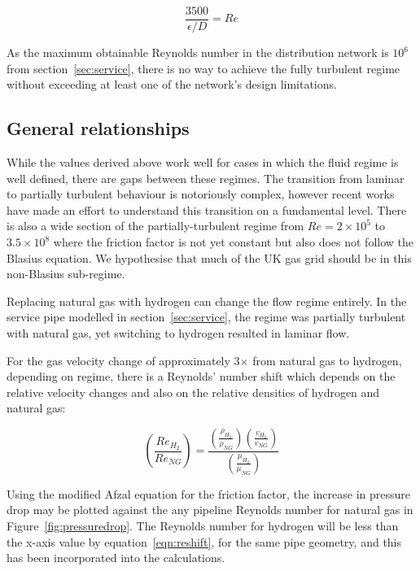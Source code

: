 \documentclass[5p]{elsarticle} %
\begin{document}
\begin{equation}
\label{eqn:piggot}
   \frac{3500}{\epsilon/D} = Re
\end{equation}

As the maximum obtainable Reynolds number in the distribution network is $10^6$ from section~\ref{sec:service}, there is no way to achieve the fully turbulent regime without exceeding at least one of the network's design limitations.

\subsection{General relationships}
\label{sec:nonblasius}

While the values derived above work well for cases in which the fluid regime is well defined, there are gaps between these regimes. 
The transition from laminar to partially turbulent behaviour is notoriously complex, however recent works have made an effort to understand this transition on a fundamental level\citep{Goldenfeld2006, She2012}.
There is also a wide section of the partially-turbulent regime from $Re = 2\times10^5$ to $3.5\times10^8$ where the friction factor is not yet constant but also does not follow the Blasius equation.
We hypothesise that much of the UK gas grid should be in this non-Blasius sub-regime.

Replacing natural gas with hydrogen can change the flow regime entirely.
In the service pipe modelled in section~\ref{sec:service}, the regime was partially turbulent with natural gas, yet switching to hydrogen resulted in laminar flow.

For the  gas velocity change of approximately 3$\times$ from natural gas to hydrogen, depending on regime, there is a Reynolds' number shift which depends on the relative velocity changes and also on the relative densities of hydrogen and natural gas:

\begin{equation}
\label{eqn:reshift}
    \left(\frac{Re_{H_2}}{Re_{NG}}\right) = 
    \frac{
        \left(\frac{\rho_{H_2}}{\rho_{NG}}\right)
        \left(\frac{v_{H_2}}{v_{NG}}\right)
    }{
        \left(\frac{\mu_{H_2}}{\mu_{NG}}\right)
    }
\end{equation}

Using the modified Afzal equation for the friction factor, the increase in pressure drop may be plotted against the any pipeline Reynolds number for natural gas in Figure~\ref{fig:pressuredrop}.
The Reynolds number for hydrogen will be less than the x-axis value by equation~\eqref{eqn:reshift}, for the same pipe geometry, and this has been incorporated into the calculations. 
\end{document}
